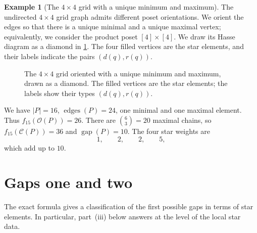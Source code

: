 \documentclass[a4paper, 11pt]{amsart}
\theoremstyle{definition}
\newtheorem{example}[theorem]{Example}
\theoremstyle{remark}
\newcommand{\cO}{\mathcal O}
\newcommand{\cC}{\mathcal C}
\newcommand{\gap}{\operatorname{gap}}
\newcommand{\ed}{\operatorname{edges}}
\begin{document}
\begin{example}[The $4\times 4$ grid with a unique minimum and maximum]\label{ex:grid}
The undirected $4\times 4$ grid graph admits different poset orientations. We orient the edges so that there is a unique minimal and a unique maximal vertex; equivalently, we consider the product poset $[4]\times[4]$. We draw its Hasse diagram as a diamond in \cref{fig:grid}. The four filled vertices are the star elements, and their labels indicate the pairs $(d(q),r(q))$.

\begin{figure}[H]
\centering
{}
\caption{The $4\times4$ grid oriented with a unique minimum and maximum, drawn as a diamond. The filled vertices are the star elements; the labels show their types $(d(q),r(q))$.}
\label{fig:grid}
\end{figure}

We have $|P|=16$, $\ed(P)=24$, one minimal and one maximal element. Thus $f_{15}(\cO(P))=26$. There are $\binom{6}{3}=20$ maximal chains, so $f_{15}(\cC(P))=36$ and $\gap(P)=10$. The four star weights are
\[
  1,\qquad 2,\qquad 2,\qquad 5,
\]
which add up to $10$.
\end{example}

\section{Gaps one and two}\label{sec:small}

The exact formula gives a classification of the first possible gaps in terms of star elements. In particular, part~(iii) below answers \cite[Question~15]{BhandariEtAl2025} at the level of the local star data.
\end{document}
